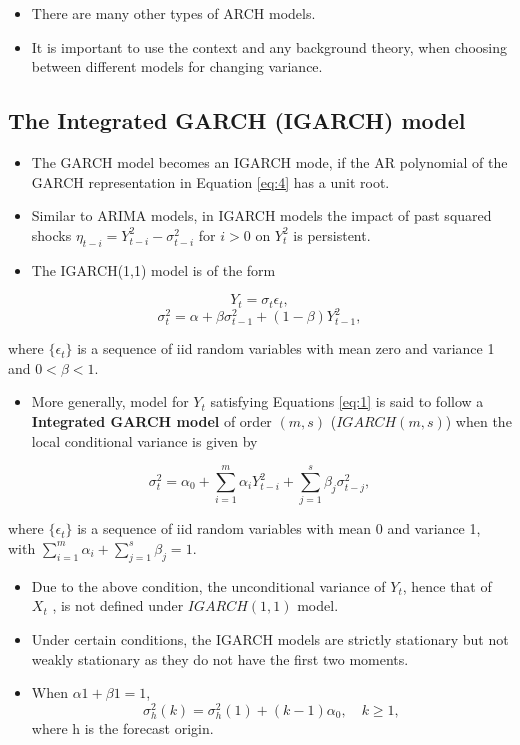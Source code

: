 \documentclass[]{book}
\providecommand{\tightlist}{%
  \setlength{\itemsep}{0pt}\setlength{\parskip}{0pt}}
\begin{document}
\begin{itemize}
\tightlist
\item
  There are many other types of ARCH models.
\item
  It is important to use the context and any background theory, when choosing between different models for changing variance.
\end{itemize}

\hypertarget{the-integrated-garch-igarch-model}{%
\subsection{The Integrated GARCH (IGARCH) model}\label{the-integrated-garch-igarch-model}}

\begin{itemize}
\tightlist
\item
  The GARCH model becomes an IGARCH mode, if the AR polynomial of the GARCH representation in Equation \ref{eq:4} has a unit root.
\item
  Similar to ARIMA models, in IGARCH models the impact of past squared shocks \(\eta_{t−i} = Y_{t-i}^2 −\sigma_{t-i}^2\) for \(i>0\) on \(Y_t^2\) is persistent.
\item
  The IGARCH(1,1) model is of the form
\end{itemize}

\[Y_t=\sigma_t\epsilon_t,\]
\[\sigma_t^2=\alpha+\beta\sigma_{t-1}^2+(1-\beta)Y_{t-1}^2,\]

where \(\{\epsilon_t\}\) is a sequence of iid random variables with mean zero and variance 1 and \(0<\beta<1.\)

\begin{itemize}
\tightlist
\item
  More generally, model for \(Y_t\) satisfying Equations \ref{eq:1} is said to follow a \textbf{Integrated GARCH model} of order \((m,s)\) (\(IGARCH(m,s)\)) when the local conditional variance is given by
\end{itemize}

\begin{equation} \label{eq:5}
\sigma_t^2 =\alpha_0+\sum_{i=1}^m\alpha_iY_{t-i}^2+\sum_{j=1}^s\beta_j\sigma_{t-j}^2,
\end{equation}

where \(\{\epsilon_t\}\) is a sequence of iid random variables with mean 0 and variance 1, with
\(\sum_{i=1}^{m}\alpha_i+\sum_{j=1}^{s}\beta_j=1.\)

\begin{itemize}
\tightlist
\item
  Due to the above condition, the unconditional variance of \(Y_t\), hence that of \(X_t\) , is not defined under \(IGARCH(1,1)\) model.
\item
  Under certain conditions, the IGARCH models are strictly stationary but not weakly stationary as they do not have the first two moments.
\item
  When \(\alpha1 + \beta1 = 1\),
  \[\sigma^2_h(k )=\sigma^2_h(1 )+(k −1)\alpha_0,\quad k\geq1,\]
  where h is the forecast origin.
\end{itemize}
\end{document}
